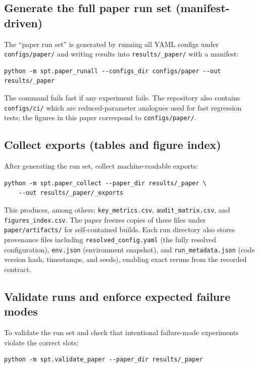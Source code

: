 \documentclass[11pt]{article}
\begin{document}
\subsection{Generate the full paper run set (manifest-driven)}

The ``paper run set'' is generated by running all YAML configs under \texttt{configs/paper/} and writing results into \texttt{results/\_paper/} with a manifest:

\begin{verbatim}
python -m spt.paper_runall --configs_dir configs/paper --out results/_paper
\end{verbatim}

The command fails fast if any experiment fails.
The repository also contains \texttt{configs/ci/} which are reduced-parameter analogues used for fast regression tests; the figures in this paper correspond to \texttt{configs/paper/}.

\subsection{Collect exports (tables and figure index)}

After generating the run set, collect machine-readable exports:

\begin{verbatim}
python -m spt.paper_collect --paper_dir results/_paper \
    --out results/_paper/_exports
\end{verbatim}

This produces, among others:
\texttt{key\_metrics.csv}, \texttt{audit\_matrix.csv}, and \texttt{figures\_index.csv}.
The paper freezes copies of these files under \texttt{paper/artifacts/} for self-contained builds.
Each run directory also stores provenance files including \texttt{resolved\_config.yaml} (the fully resolved configuration), \texttt{env.json} (environment snapshot), and \texttt{run\_metadata.json} (code version hash, timestamps, and seeds), enabling exact reruns from the recorded contract.

\subsection{Validate runs and enforce expected failure modes}

To validate the run set and check that intentional failure-mode experiments violate the correct slots:

\begin{verbatim}
python -m spt.validate_paper --paper_dir results/_paper
\end{verbatim}
\end{document}
